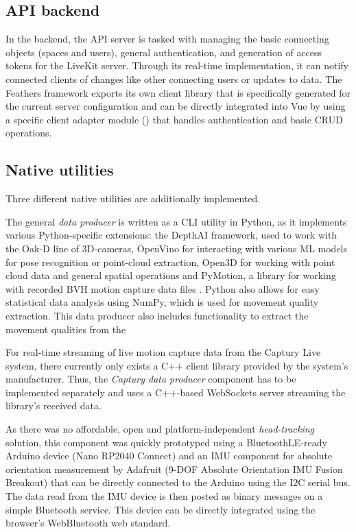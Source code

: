 \subsection{API backend}

In the backend, the \ac{API} server is tasked with managing the basic connecting objects (spaces and users), general authentication, and generation of access tokens for the LiveKit server.
Through its real-time implementation, it can notify connected clients of changes like other connecting users or updates to data.
The Feathers framework exports its own client library that is specifically generated for the current server configuration and can be directly integrated into Vue by using a specific client adapter module () that handles authentication and basic \ac{CRUD} operations.

\subsection{Native utilities}

Three different native utilities are additionally implemented.

The general \emph{data producer} is written as a \ac{CLI} utility in Python, as it implements various Python-specific extensions: the DepthAI framework, used to work with the Oak-D line of \ac{3D}-cameras, OpenVino for interacting with various \ac{ML} models for pose recognition or point-cloud extraction, Open3D \parencite{open3DZhou2018} for working with point cloud data and general spatial operations and PyMotion, a library for working with recorded \ac{BVH} motion capture data files \parencite{githubPyMotion}.
Python also allows for easy statistical data analysis using NumPy, which is used for movement quality extraction.
This data producer also includes functionality to extract the movement qualities from the

For real-time streaming of live motion capture data from the Captury Live system, there currently only exists a C++ client library provided by the system's manufacturer.
Thus, the \emph{Captury data producer} component has to be implemented separately and uses a C++-based WebSockets server streaming the library's received data.

As there was no affordable, open and platform-independent \emph{head-tracking} solution, this component was quickly prototyped using a BluetoothLE-ready Arduino device (Nano RP2040 Connect) and an \ac{IMU} component for absolute orientation measurement by Adafruit (9-DOF Absolute Orientation IMU Fusion Breakout) that can be directly connected to the Arduino using the \ac{I2C} serial bus.
The data read from the \ac{IMU} device is then posted as binary messages on a simple Bluetooth service.
This device can be directly integrated using the browser's WebBluetooth web standard.

